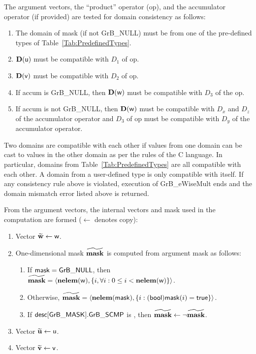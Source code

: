 The argument vectors, the ``product'' operator ({\sf op}), and the accumulator 
operator (if provided) are tested for domain consistency as follows:
\begin{enumerate}
	\item The domain of {\sf mask} (if not {\sf GrB\_NULL}) must be from one of the pre-defined types of Table~\ref{Tab:PredefinedTypes}.

	\item $\bold{D}({\sf u})$ must be compatible with $D_1$ of {\sf op}.

	\item $\bold{D}({\sf v})$ must be compatible with $D_2$ of {\sf op}.

	\item If {\sf accum} is {\sf GrB\_NULL}, then $\bold{D}({\sf w})$ must be 
    compatible with $D_3$ of the {\sf op}.

	\item If {\sf accum} is not {\sf GrB\_NULL}, then $\bold{D}({\sf w})$ must be
    compatible with $D_x$ and $D_z$ of the accumulator operator and $D_3$ of
    {\sf op} must be compatible with $D_y$ of the accumulator operator.
\end{enumerate}
Two domains are compatible with each other if values from one domain can be cast 
to values in the other domain as per the rules of the C language.
In particular, domains from Table~\ref{Tab:PredefinedTypes} are all compatible 
with each other. A domain from a user-defined type is only compatible with itself.
If any consistency rule above is violated, execution of {\sf GrB\_eWiseMult} ends
and the domain mismatch error listed above is returned.

From the argument vectors, the internal vectors and mask used in 
the computation are formed ($\leftarrow$ denotes copy):
\begin{enumerate}
	\item Vector ${\bf \widetilde{w}} \leftarrow {\sf w}$.

	\item One-dimensional mask ${\bf \widetilde{mask}}$ is computed from 
    argument {\sf mask} as follows:
	\begin{enumerate}
		\item	If ${\sf mask} = {\sf GrB\_NULL}$, then ${\bf \widetilde{mask}} = 
        \langle \bold{nelem}({\sf w}), \{i, \forall i : 0 \leq i < 
        \bold{nelem}({\sf w}) \} \rangle$.

		\item	Otherwise, ${\bf \widetilde{mask}} = 
        \langle \bold{nelem}({\sf mask}), \{i : ({\sf bool}){\sf mask}(i) = 
        {\sf true}\} \rangle$.

		\item	If ${\sf desc[GrB\_MASK].GrB\_SCMP}$ is \true, then ${\bf \widetilde{mask}} \leftarrow \neg {\bf \widetilde{mask}}$.
	\end{enumerate}

	\item Vector ${\bf \widetilde{u}} \leftarrow {\sf u}$.

	\item Vector ${\bf \widetilde{v}} \leftarrow {\sf v}$.
\end{enumerate}

